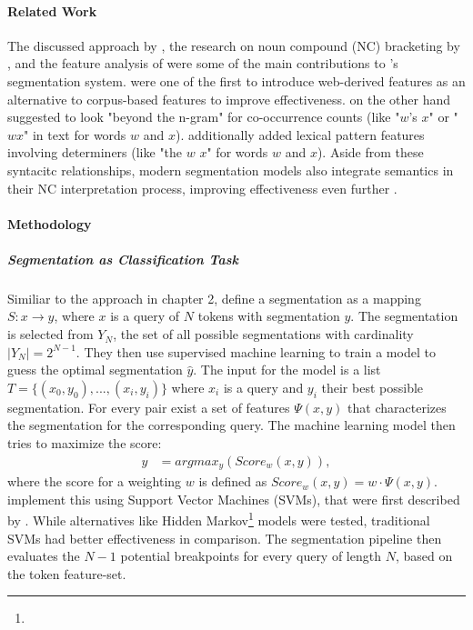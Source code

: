 \paragraph*{Related Work}
The discussed approach by \citet{Risvik:2003}, the research on noun compound (NC) bracketing by \citet{Nakov:2005}, and the feature analysis of \citet{Keller:2003} were some of the main contributions to \citeauthor{Bergsma:2007}'s segmentation system. \citeauthor{Keller:2003} were one of the first to introduce web-derived features as an alternative to corpus-based features to improve effectiveness. \citeauthor{Nakov:2005} on the other hand suggested to look "beyond the n-gram" for co-occurrence counts (like "$w$'s $x$" or "$wx$" in text for words $w$ and $x$).
\citeauthor{Nicholson:2005} additionally added lexical pattern features involving determiners (like "the $w$ $x$" for words $w$ and $x$). Aside from these syntacitc relationships, modern segmentation models also integrate semantics in their NC interpretation process, improving effectiveness even further \cite{Girju:2005}.

\paragraph*{Methodology}
\subparagraph*{\textbf{Segmentation as Classification Task}}
Similiar to the approach in chapter 2, \citeauthor{Bergsma:2007} define a segmentation as a mapping $S: x \to y$, where $x$ is a query of $N$ tokens with segmentation $y$. The segmentation is selected from $Y_N$, the set of all possible segmentations with cardinality $|Y_N| = 2^{N-1}$. They then use supervised machine learning to train a model to guess the optimal segmentation $\hat{y}$. The input for the model is a list $T = \{(x_0, y_0), ..., (x_i, y_i)\}$ where $x_i$ is a query and $y_i$ their best possible segmentation. For every pair exist a set of features $\Psi(x,y)$ that characterizes the segmentation for the corresponding query. The machine learning model then tries to maximize the score:
\begin{align*}
	\hat{y} &= argmax_y(Score_w(x,y)),
\end{align*}
where the score for a weighting $w$ is defined as $Score_w(x,y) = w \cdot \Psi(x,y)$. \citeauthor{Bergsma:2007} implement this using Support Vector Machines (SVMs), that were first described by \citet{Joachims:2002}. While alternatives like Hidden Markov\footnote{} models were tested, traditional SVMs had better effectiveness in comparison. The segmentation pipeline then evaluates the $N-1$ potential breakpoints for every query of length $N$, based on the token feature-set.


